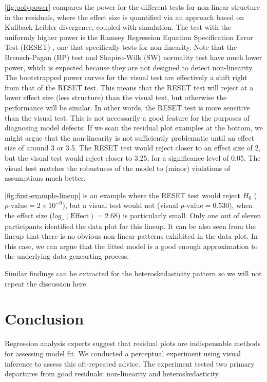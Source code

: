 \documentclass{vgtc}                          %
\begin{document}
\autoref{fig:polypower} compares the power for the different tests
for non-linear structure in the residuals, where the effect size is 
quantified via an approach based on Kullback-Leibler divergence, 
coupled with simulation. The test with the uniformly
higher power is the Ramsey Regression Equation
Specification Error Test (RESET) \cite{ramsey1969tests}, 
one that specifically tests for
non-linearity. Note that the Breusch-Pagan (BP) test \cite{breusch1979simple}
and Shapiro-Wilk (SW) normality test \cite{shapiro1965analysis} 
have much lower power,
which is expected because they are not designed to detect non-linearity.
The bootstrapped power curves for the visual test are effectively a
shift right from that of the RESET test. This means that the RESET test
will reject at a lower effect size (less structure) than the visual
test, but otherwise the performance will be similar. In other words, the
RESET test is more sensitive than the visual test. This is not
necessarily a good feature for the purposes of diagnosing model defects:
If we scan the residual plot examples at the bottom, we might argue that
the non-linearity is not sufficiently problematic until an effect size
of around 3 or 3.5. The RESET test would reject closer to an effect size
of 2, but the visual test would reject closer to 3.25, for a significance
level of 0.05. The visual test matches the robustness of the model to
(minor) violations of assumptions much better.

\autoref{fig:first-example-lineup} is an example where the 
RESET test would reject \(H_0\)
(\(p\text{-value} = 2 \times 10^{-9}\)), 
but a visual test would not (visual \(p\text{-value} = 0.530\)), 
when the effect size (\(log_e(\text{Effect}) = 2.68\)) is particularly small. 
Only one out of eleven participants identified the data plot for this lineup. 
It can be also seen from the lineup that there is no
obvious non-linear patterns exhibited in the data plot. 
In this case, we can argue that the fitted model is a good enough 
approximation to the underlying data genearting process.

Similar findings can be extracted for the heteroskedasticity pattern so 
we will not repeat the discussion here.

\section{Conclusion}
\label{sec:conclusion}

Regression analysis experts suggest that residual plots are
indispensable methods for assessing model fit. We conducted a perceptual
experiment using visual inference to assess this oft-repeated advice.
The experiment tested two primary departures from good residuals:
non-linearity and heteroskedasticity.
\end{document}
